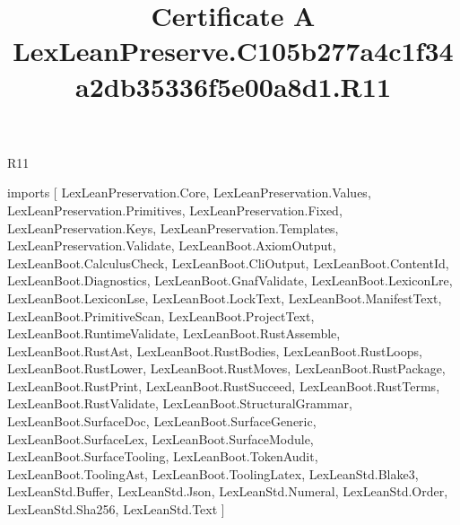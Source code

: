 \begin{lexlean}{R11}
\title{Certificate A LexLeanPreserve.C105b277a4c1f34a2db35336f5e00a8d1.R11}
\begin{coremodule}
imports [
  LexLeanPreservation.Core,
  LexLeanPreservation.Values,
  LexLeanPreservation.Primitives,
  LexLeanPreservation.Fixed,
  LexLeanPreservation.Keys,
  LexLeanPreservation.Templates,
  LexLeanPreservation.Validate,
  LexLeanBoot.AxiomOutput,
  LexLeanBoot.CalculusCheck,
  LexLeanBoot.CliOutput,
  LexLeanBoot.ContentId,
  LexLeanBoot.Diagnostics,
  LexLeanBoot.GnafValidate,
  LexLeanBoot.LexiconLre,
  LexLeanBoot.LexiconLse,
  LexLeanBoot.LockText,
  LexLeanBoot.ManifestText,
  LexLeanBoot.PrimitiveScan,
  LexLeanBoot.ProjectText,
  LexLeanBoot.RuntimeValidate,
  LexLeanBoot.RustAssemble,
  LexLeanBoot.RustAst,
  LexLeanBoot.RustBodies,
  LexLeanBoot.RustLoops,
  LexLeanBoot.RustLower,
  LexLeanBoot.RustMoves,
  LexLeanBoot.RustPackage,
  LexLeanBoot.RustPrint,
  LexLeanBoot.RustSucceed,
  LexLeanBoot.RustTerms,
  LexLeanBoot.RustValidate,
  LexLeanBoot.StructuralGrammar,
  LexLeanBoot.SurfaceDoc,
  LexLeanBoot.SurfaceGeneric,
  LexLeanBoot.SurfaceLex,
  LexLeanBoot.SurfaceModule,
  LexLeanBoot.SurfaceTooling,
  LexLeanBoot.TokenAudit,
  LexLeanBoot.ToolingAst,
  LexLeanBoot.ToolingLatex,
  LexLeanStd.Blake3,
  LexLeanStd.Buffer,
  LexLeanStd.Json,
  LexLeanStd.Numeral,
  LexLeanStd.Order,
  LexLeanStd.Sha256,
  LexLeanStd.Text
]


\end{coremodule}
\end{lexlean}
